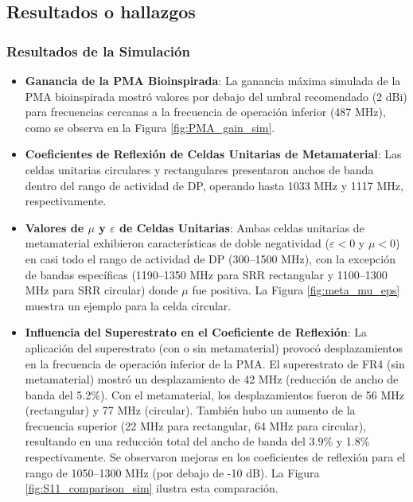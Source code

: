 \documentclass[11pt,a4paper]{article}
\begin{document}
\subsection*{Resultados o hallazgos}

\subsubsection*{Resultados de la Simulación}
\begin{itemize}
    \item \textbf{Ganancia de la PMA Bioinspirada}: La ganancia máxima simulada de la PMA bioinspirada mostró valores por debajo del umbral recomendado (2 dBi) para frecuencias cercanas a la frecuencia de operación inferior (487 MHz), como se observa en la Figura \ref{fig:PMA_gain_sim}.
    \item \textbf{Coeficientes de Reflexión de Celdas Unitarias de Metamaterial}: Las celdas unitarias circulares y rectangulares presentaron anchos de banda dentro del rango de actividad de DP, operando hasta 1033 MHz y 1117 MHz, respectivamente.
    \item \textbf{Valores de $\mu$ y $\varepsilon$ de Celdas Unitarias}: Ambas celdas unitarias de metamaterial exhibieron características de doble negatividad ($\varepsilon < 0$ y $\mu < 0$) en casi todo el rango de actividad de DP (300--1500 MHz), con la excepción de bandas específicas (1190--1350 MHz para SRR rectangular y 1100--1300 MHz para SRR circular) donde $\mu$ fue positiva. La Figura \ref{fig:meta_mu_eps} muestra un ejemplo para la celda circular.
    \item \textbf{Influencia del Superestrato en el Coeficiente de Reflexión}: La aplicación del superestrato (con o sin metamaterial) provocó desplazamientos en la frecuencia de operación inferior de la PMA. El superestrato de FR4 (sin metamaterial) mostró un desplazamiento de 42 MHz (reducción de ancho de banda del 5.2\%). Con el metamaterial, los desplazamientos fueron de 56 MHz (rectangular) y 77 MHz (circular). También hubo un aumento de la frecuencia superior (22 MHz para rectangular, 64 MHz para circular), resultando en una reducción total del ancho de banda del 3.9\% y 1.8\% respectivamente. Se observaron mejoras en los coeficientes de reflexión para el rango de 1050--1300 MHz (por debajo de -10 dB). La Figura \ref{fig:S11_comparison_sim} ilustra esta comparación.

\end{itemize}
\end{document}
